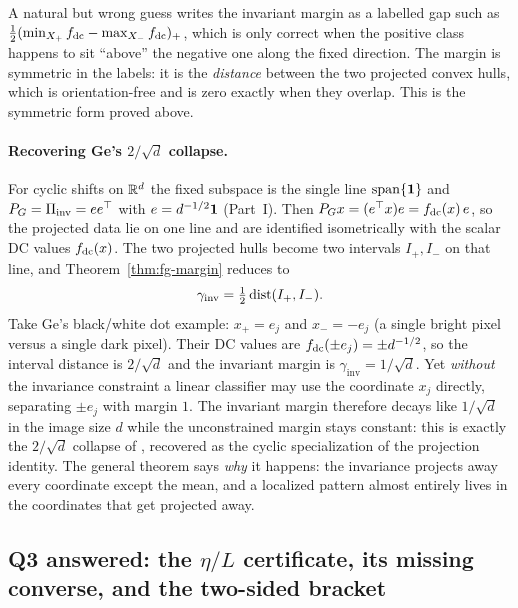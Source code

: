 \begin{remark}
A natural but wrong guess writes the invariant margin as a labelled gap such as
$\tfrac12(\min_{X_+}f_{\mathrm{dc}} - \max_{X_-}f_{\mathrm{dc}})_+$, which is only correct when the positive class happens
to sit ``above'' the negative one along the fixed direction. The margin is symmetric in the labels:
it is the \emph{distance} between the two projected convex hulls, which is orientation-free and is
zero exactly when they overlap. This is the symmetric form proved above.
\end{remark}

\paragraph{Recovering Ge's $2/\sqrt d$ collapse.}
For cyclic shifts on $\mathbb{R}^d$ the fixed subspace is the single line $\mathrm{span}\{\mathbf 1\}$ and
$P_G = \Pi_{\mathrm{inv}} = ee^\top$ with $e = d^{-1/2}\mathbf 1$ (Part~I). Then $P_G x = (e^\top x)e = f_{\mathrm{dc}}(x)\,e$,
so the projected data lie on one line and are identified isometrically with the scalar DC values
$f_{\mathrm{dc}}(x)$. The two projected hulls become two intervals $I_+, I_-$ on that line, and
Theorem~\ref{thm:fg-margin} reduces to
\[
\gamma_{\mathrm{inv}} = \tfrac12\operatorname{dist}(I_+, I_-).
\]
Take Ge's black/white dot example: $x_+ = e_j$ and $x_- = -e_j$ (a single bright pixel versus a
single dark pixel). Their DC values are $f_{\mathrm{dc}}(\pm e_j) = \pm d^{-1/2}$, so the interval distance is
$2/\sqrt d$ and the invariant margin is $\gamma_{\mathrm{inv}} = 1/\sqrt d$. Yet \emph{without} the
invariance constraint a linear classifier may use the coordinate $x_j$ directly, separating
$\pm e_j$ with margin $1$. The invariant margin therefore decays like $1/\sqrt d$ in the image size
$d$ while the unconstrained margin stays constant: this is exactly the $2/\sqrt d$ collapse of
\citet{ge2021shift}, recovered as the cyclic specialization of the projection identity. The general
theorem says \emph{why} it happens: the invariance projects away every coordinate except the mean,
and a localized pattern almost entirely lives in the coordinates that get projected away.


\subsection{Q3 answered: the $\eta/L$ certificate, its missing converse, and the two-sided bracket}
\label{sub:sandwich}

